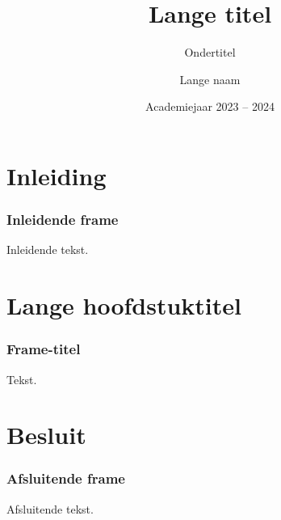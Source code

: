 \documentclass
[kulak,handout] %
{kulakbeamer}
\title[Korte titel]{Lange titel}
\subtitle{Ondertitel}
\author[Korte naam]{Lange naam}
\institute[Kulak]{KU Leuven Kulak}
\date{Academiejaar 2023 -- 2024}
\begin{document}
	
	\begin{titleframe}
		\titlepage
	\end{titleframe}
	
	\begin{outlineframe}[Overzicht]
		\tableofcontents
	\end{outlineframe}
	
	
	\section{Inleiding}
	
	\begin{frame}
		\frametitle{Inleidende frame}
		Inleidende tekst.
	\end{frame}
	
	\section[Korte titel]{Lange hoofdstuktitel}
	
	\begin{frame}
		\frametitle{Frame-titel}
		Tekst.
	\end{frame}
	
	\section{Besluit}
	\begin{frame}
		\frametitle{Afsluitende frame}
		Afsluitende tekst.
	\end{frame}
	
\end{document}
